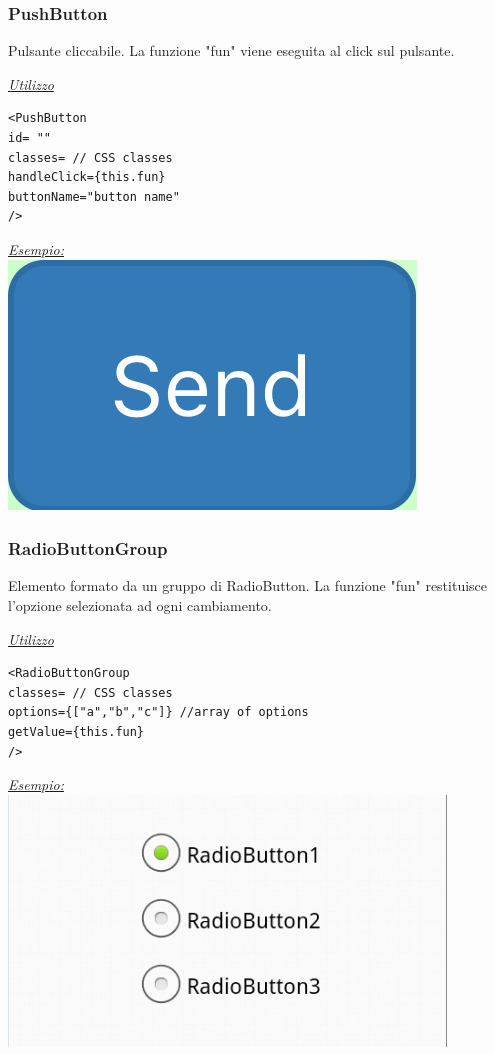 \subsubsection{PushButton}
Pulsante cliccabile. La funzione "fun" viene eseguita al click sul pulsante.
\begin{center}
\underline{\textit{Utilizzo}}
\begin{lstlisting}
<PushButton
id= ""
classes= // CSS classes
handleClick={this.fun}
buttonName="button name"
/>
\end{lstlisting}
\underline{\textit{Esempio:}}
\\
\includegraphics[scale=0.25]{img/pushB.png}
\\
\end{center}

\subsubsection{RadioButtonGroup}
Elemento formato da un gruppo di RadioButton. La funzione "fun" restituisce l'opzione selezionata ad ogni cambiamento.
\begin{center}
\underline{\textit{Utilizzo}}
\begin{lstlisting}
<RadioButtonGroup
classes= // CSS classes
options={["a","b","c"]} //array of options
getValue={this.fun}
/>
\end{lstlisting}
\underline{\textit{Esempio:}}
\\
\includegraphics[scale=0.6]{img/radiob.png}
\\
\end{center}

